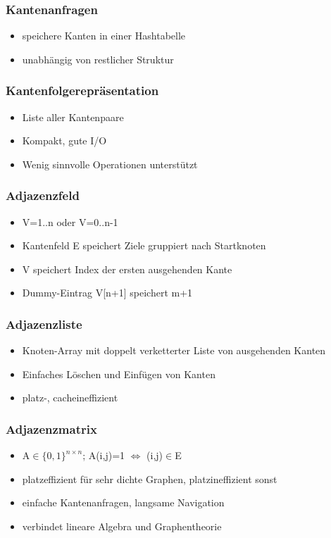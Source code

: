 \begin{frame}
\frametitle{Kantenanfragen}
\begin{itemize}
\item speichere Kanten in einer Hashtabelle
\item unabhängig von restlicher Struktur
\end{itemize}
\end{frame}

\begin{frame}
\frametitle{Kantenfolgerepräsentation}
\begin{itemize}
\item Liste aller Kantenpaare\pause
\item Kompakt, gute I/O
\item Wenig sinnvolle Operationen unterstützt
\end{itemize}
\end{frame}

\begin{frame}
\frametitle{Adjazenzfeld}
\begin{itemize}
\item V=1..n oder V=0..n-1
\item Kantenfeld E speichert Ziele gruppiert nach Startknoten
\item V speichert Index der ersten ausgehenden Kante\pause
\item Dummy-Eintrag V[n+1] speichert m+1
\end{itemize}
\end{frame}

\begin{frame}
\frametitle{Adjazenzliste}
\begin{itemize}
\item Knoten-Array mit doppelt verketterter Liste von ausgehenden Kanten\pause
\item Einfaches Löschen und Einfügen von Kanten
\item platz-, cacheineffizient
\end{itemize}
\end{frame}

\begin{frame}
\frametitle{Adjazenzmatrix}
\begin{itemize}
\item A$\in\{0,1\}^{n\times n}$; A(i,j)=1 $\Leftrightarrow$ (i,j)$\in$E\pause
\item platzeffizient für sehr dichte Graphen, platzineffizient sonst
\item einfache Kantenanfragen, langsame Navigation
\item verbindet lineare Algebra und Graphentheorie
\end{itemize}
\end{frame}

